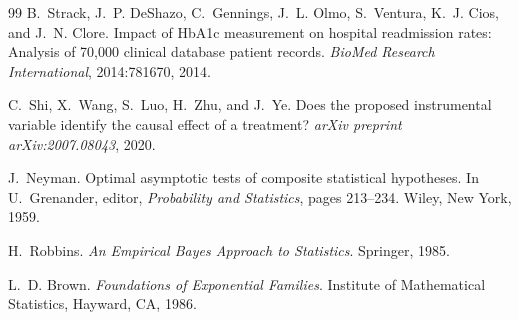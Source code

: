 \documentclass[11pt,a4paper]{article}
\theoremstyle{mitheorem}
\theoremstyle{mitdef}
\begin{document}
\begin{thebibliography}{99}
B.~Strack, J.~P. DeShazo, C.~Gennings, J.~L. Olmo, S.~Ventura, K.~J. Cios, and
  J.~N. Clore.
\newblock Impact of HbA1c measurement on hospital readmission rates: Analysis
  of 70,000 clinical database patient records.
\newblock \emph{BioMed Research International}, 2014:781670, 2014.

C.~Shi, X.~Wang, S.~Luo, H.~Zhu, and J.~Ye.
\newblock Does the proposed instrumental variable identify the causal effect of
  a treatment?
\newblock \emph{arXiv preprint arXiv:2007.08043}, 2020.

J.~Neyman.
\newblock Optimal asymptotic tests of composite statistical hypotheses.
\newblock In U.~Grenander, editor, \emph{Probability and Statistics}, pages
  213--234. Wiley, New York, 1959.

H.~Robbins.
\newblock \emph{An Empirical Bayes Approach to Statistics}.
\newblock Springer, 1985.

L.~D. Brown.
\newblock \emph{Foundations of Exponential Families}.
\newblock Institute of Mathematical Statistics, Hayward, CA, 1986.

\end{thebibliography}
\end{document}
